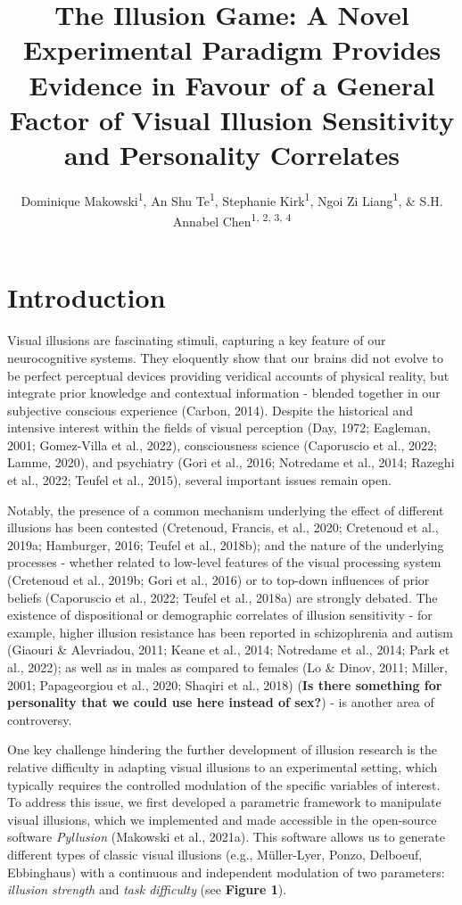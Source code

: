 \documentclass[
  man,floatsintext]{apa6}
\title{\textbf{The Illusion Game: A Novel Experimental Paradigm Provides Evidence in Favour of a General Factor of Visual Illusion Sensitivity and Personality Correlates}}
\author{Dominique Makowski\textsuperscript{1}, An Shu Te\textsuperscript{1}, Stephanie Kirk\textsuperscript{1}, Ngoi Zi Liang\textsuperscript{1}, \& S.H. Annabel Chen\textsuperscript{1, 2, 3, 4}}
\date{}
\affiliation{\vspace{0.5cm}\textsuperscript{1} School of Social Sciences, Nanyang Technological University, Singapore\\\textsuperscript{2} LKC Medicine, Nanyang Technological University, Singapore\\\textsuperscript{3} National Institute of Education, Singapore\\\textsuperscript{4} Centre for Research and Development in Learning, Nanyang Technological University, Singapore}
\begin{document}
\maketitle

\hypertarget{introduction}{%
\section{Introduction}\label{introduction}}

Visual illusions are fascinating stimuli, capturing a key feature of our neurocognitive systems. They eloquently show that our brains did not evolve to be perfect perceptual devices providing veridical accounts of physical reality, but integrate prior knowledge and contextual information - blended together in our subjective conscious experience (Carbon, 2014). Despite the historical and intensive interest within the fields of visual perception (Day, 1972; Eagleman, 2001; Gomez-Villa et al., 2022), consciousness science (Caporuscio et al., 2022; Lamme, 2020), and psychiatry (Gori et al., 2016; Notredame et al., 2014; Razeghi et al., 2022; Teufel et al., 2015), several important issues remain open.

Notably, the presence of a common mechanism underlying the effect of different illusions has been contested (Cretenoud, Francis, et al., 2020; Cretenoud et al., 2019a; Hamburger, 2016; Teufel et al., 2018b); and the nature of the underlying processes - whether related to low-level features of the visual processing system (Cretenoud et al., 2019b; Gori et al., 2016) or to top-down influences of prior beliefs (Caporuscio et al., 2022; Teufel et al., 2018a) are strongly debated. The existence of dispositional or demographic correlates of illusion sensitivity - for example, higher illusion resistance has been reported in schizophrenia and autism (Giaouri \& Alevriadou, 2011; Keane et al., 2014; Notredame et al., 2014; Park et al., 2022); as well as in males as compared to females (Lo \& Dinov, 2011; Miller, 2001; Papageorgiou et al., 2020; Shaqiri et al., 2018) (\textbf{Is there something for personality that we could use here instead of sex?}) - is another area of controversy.

One key challenge hindering the further development of illusion research is the relative difficulty in adapting visual illusions to an experimental setting, which typically requires the controlled modulation of the specific variables of interest.
To address this issue, we first developed a parametric framework to manipulate visual illusions, which we implemented and made accessible in the open-source software \emph{Pyllusion} (Makowski et al., 2021a). This software allows us to generate different types of classic visual illusions (e.g., Müller-Lyer, Ponzo, Delboeuf, Ebbinghaus) with a continuous and independent modulation of two parameters: \emph{illusion strength} and \emph{task difficulty} (see \textbf{Figure 1}).
\end{document}
